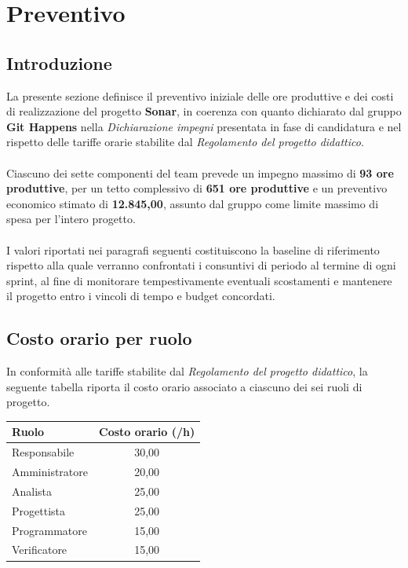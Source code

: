 \newpage

\section{Preventivo}
\subsection{Introduzione}
La presente sezione definisce il preventivo iniziale delle ore produttive e dei costi di realizzazione del progetto \textbf{Sonar}, in coerenza con quanto dichiarato dal gruppo \textbf{Git Happens} nella \textit{Dichiarazione impegni} presentata in fase di candidatura e nel rispetto delle tariffe orarie stabilite dal \textit{Regolamento del progetto didattico}. \\
\\
Ciascuno dei sette componenti del team prevede un impegno massimo di \textbf{93 ore produttive}, per un tetto complessivo di \textbf{651 ore produttive} e un preventivo economico stimato di \textbf{\texteuro{} 12.845,00}, assunto dal gruppo come limite massimo di spesa per l'intero progetto. \\
\\
I valori riportati nei paragrafi seguenti costituiscono la baseline di riferimento rispetto alla quale verranno confrontati i consuntivi di periodo al termine di ogni sprint, al fine di monitorare tempestivamente eventuali scostamenti e mantenere il progetto entro i vincoli di tempo e budget concordati.

\subsection{Costo orario per ruolo}
In conformità alle tariffe stabilite dal \textit{Regolamento del progetto didattico}, la seguente tabella riporta il costo orario associato a ciascuno dei sei ruoli di progetto.

\vspace{2mm}
\renewcommand{\arraystretch}{1.3}
\noindent
\begin{tabularx}{\textwidth}{|X c|}
\hline
\textbf{Ruolo} & \textbf{Costo orario (\texteuro{}/h)} \\
\hline
Responsabile & 30,00 \\
Amministratore & 20,00 \\
Analista & 25,00 \\
Progettista & 25,00 \\
Programmatore & 15,00 \\
Verificatore & 15,00 \\
\hline
\end{tabularx}

